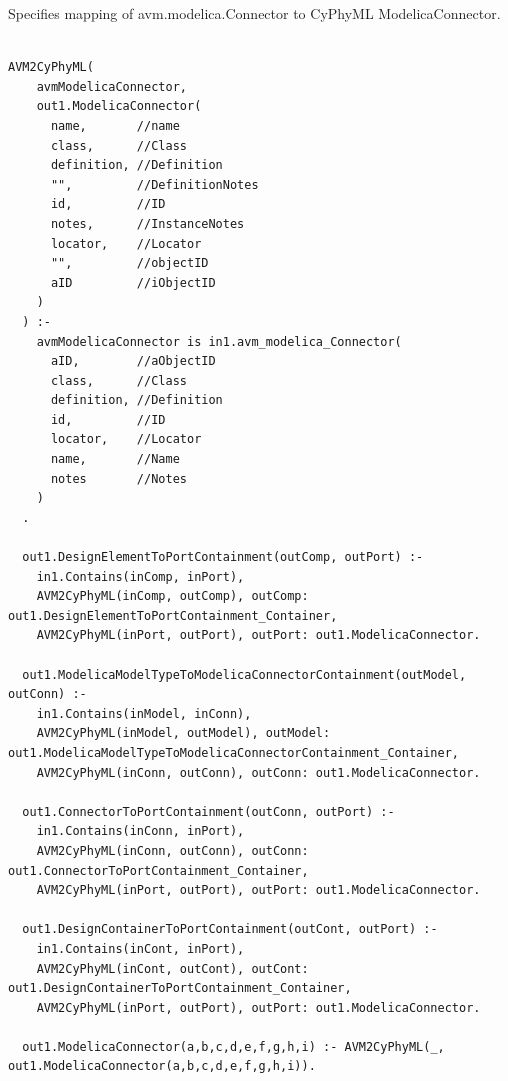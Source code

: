 Specifies mapping of avm.modelica.Connector to CyPhyML ModelicaConnector.
\begin{lstlisting}

AVM2CyPhyML(
    avmModelicaConnector,
    out1.ModelicaConnector(
      name,       //name
      class,      //Class
      definition, //Definition
      "",         //DefinitionNotes
      id,         //ID
      notes,      //InstanceNotes
      locator,    //Locator
      "",         //objectID
      aID         //iObjectID
    )
  ) :-
    avmModelicaConnector is in1.avm_modelica_Connector(
      aID,        //aObjectID
      class,      //Class
      definition, //Definition
      id,         //ID
      locator,    //Locator
      name,       //Name
      notes       //Notes
    )
  .

  out1.DesignElementToPortContainment(outComp, outPort) :-
    in1.Contains(inComp, inPort),
    AVM2CyPhyML(inComp, outComp), outComp: out1.DesignElementToPortContainment_Container,
    AVM2CyPhyML(inPort, outPort), outPort: out1.ModelicaConnector.

  out1.ModelicaModelTypeToModelicaConnectorContainment(outModel, outConn) :-
    in1.Contains(inModel, inConn),
    AVM2CyPhyML(inModel, outModel), outModel: out1.ModelicaModelTypeToModelicaConnectorContainment_Container,
    AVM2CyPhyML(inConn, outConn), outConn: out1.ModelicaConnector.

  out1.ConnectorToPortContainment(outConn, outPort) :-
    in1.Contains(inConn, inPort),
    AVM2CyPhyML(inConn, outConn), outConn: out1.ConnectorToPortContainment_Container,
    AVM2CyPhyML(inPort, outPort), outPort: out1.ModelicaConnector.

  out1.DesignContainerToPortContainment(outCont, outPort) :-
    in1.Contains(inCont, inPort),
    AVM2CyPhyML(inCont, outCont), outCont: out1.DesignContainerToPortContainment_Container,
    AVM2CyPhyML(inPort, outPort), outPort: out1.ModelicaConnector.

  out1.ModelicaConnector(a,b,c,d,e,f,g,h,i) :- AVM2CyPhyML(_, out1.ModelicaConnector(a,b,c,d,e,f,g,h,i)).


\end{lstlisting}


